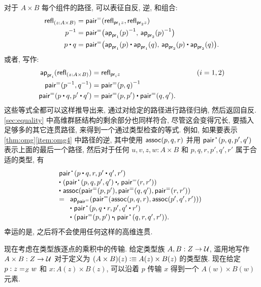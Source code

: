 对于 $A\times B$ 每个组件的路径, 可以表征自反, 逆, 和组合:
\begin{align*}
{\refl{(z : A \times B)}}
    &= {\pairpath (\refl{\proj{1} z},\refl{\proj{2} z})} \\
    {\opp{p}}
    &= {\pairpath \big(\opp{\projpath{1} (p)},\, \opp{\projpath{2} (p)}\big)} \\
    {{p \ct q}}
    &= {\pairpath \big({\projpath{1} (p)} \ct {\projpath{1} (q)},\,{\projpath{2} (p)} \ct {\projpath{2} (q)}\big)}.
\end{align*}
或者, 写作:
\begin{alignat*}{2}
    \projpath{i}(\refl{(z : A \times B)}) &= \refl{\proj{i} z} &\qquad (i=1,2)\\
    \pairpath(\opp p, \opp q) &= \opp{\pairpath(p,q)}\\
    \pairpath(p\ct q, p'\ct q') &= \pairpath(p,p') \ct \pairpath(q,q').
\end{alignat*}
这些等式全都可以这样推导出来, 通过对给定的路径进行路径归纳, 然后返回自反.
\cref{sec:equality} 中高维群胚结构的剩余部分也同样符合, 尽管这会变得冗长, 要插入足够多的其它连贯路径, 来得到一个通过类型检查的等式.
例如, 如果要表示 \cref{thm:omg}\ref{item:omg4} 中路径的逆, 其中使用 $\ctassoc(p,q,r)$ 并用 $\pairct(p,q,p',q')$ 表示上面的最后一个路径, 然后对于任何 $u,v,z,w:A\times B$ 和 $p,q,r,p',q',r'$ 属于合适的类型, 有
\begin{equation*}
    \begin{array}{l}
        \pairct(p\ct q, r, p'\ct q', r')                                    \\
        \ct\;  (\pairct(p,q,p',q') \rightwhisker \pairpath(r,r'))             \\
        \ct\;  \ctassoc(\pairpath(p,p'),\pairpath(q,q'),\pairpath(r,r'))      \\
        =
        \begin{array}[t]{l}
            \apfunc{\pairpath}({\pairpath(\ctassoc(p,q,r),\ctassoc(p',q',r'))}) \\
            \ct\; \pairct(p, q\ct r, p', q'\ct r')                              \\
            \ct\; (\pairpath(p,p') \leftwhisker \pairct(q,r,q',r')).
        \end{array}
    \end{array}
\end{equation*}
幸运的是, 之后将不会使用任何这样的高维连贯.

%
现在考虑在类型族逐点的乘积中的传输.
给定类型族 $ A, B : Z \to \type$, 滥用地写作 $A\times B:Z\to \type$ 对于定义为 $(A\times B)(z) \defeq A(z) \times B(z)$ 的类型族.
现在给定 $p : \id[Z]{z}{w}$ 和 $x : A(z) \times B(z)$, 可以沿着 $p$ 传输 $x$ 得到一个 $A(w)\times B(w)$ 元素.

